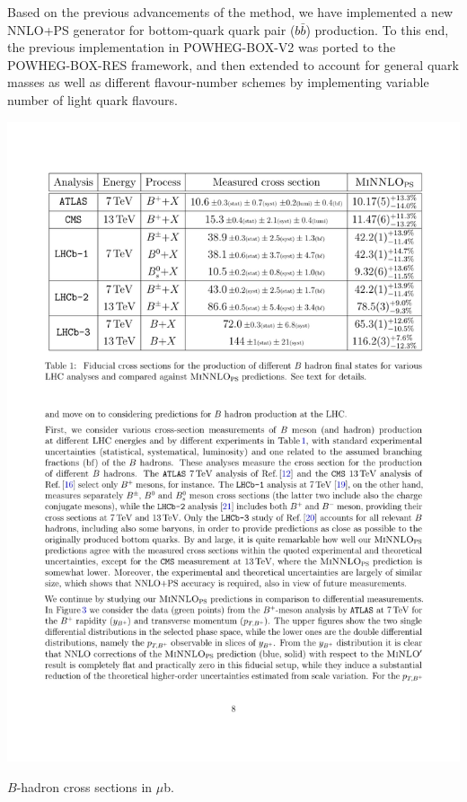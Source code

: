 \documentclass{FBR_Bericht_2025}
\begin{document}
\begin{refsection}
Based on the previous advancements of the \minnlo{} method,
we have implemented a new NNLO+PS generator for bottom-quark quark pair ($b\bar b$) production.
To this end, the previous \minnlo{} implementation in POWHEG-BOX-V2 was ported 
to the POWHEG-BOX-RES framework, and then extended to account for 
general quark masses as well as different flavour-number schemes by implementing
variable number of light quark flavours.


\begin{table}[b!]
\begin{center}
\includegraphics[width=1\linewidth]{plots/bb_table.pdf}
\caption{$B$-hadron cross sections in $\mu$b.}
\label{tab:bb}
\end{center}
\end{table}


\end{refsection}
\end{document}
